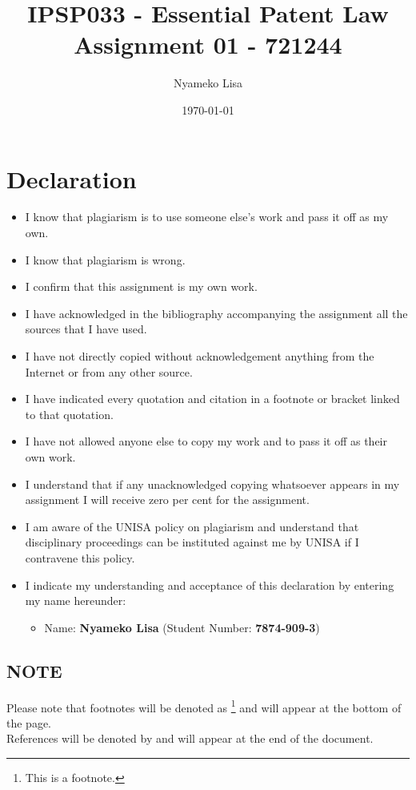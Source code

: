 \documentclass[11pt]{article}
\author{Nyameko Lisa}
\date{\today}
\title{IPSP033 - Essential Patent Law\\\medskip
\large Assignment 01 - 721244}
\begin{document}
\maketitle

\justifying
\section*{Declaration}
\label{sec:org9d7821d}
\begin{itemize}
\item I know that plagiarism is to use someone else’s work and pass it off as my own.
\item I know that plagiarism is wrong.
\item I confirm that this assignment is my own work.
\item I have acknowledged in the bibliography accompanying the assignment all the sources that I have used.
\item I have not directly copied without acknowledgement anything from the Internet or from any other source.
\item I have indicated every quotation and citation in a footnote or bracket linked to that quotation.
\item I have not allowed anyone else to copy my work and to pass it off as their own work.
\item I understand that if any unacknowledged copying whatsoever appears in my assignment I will receive zero per cent for the assignment.
\item I am aware of the UNISA policy on plagiarism and understand that disciplinary proceedings can be instituted against me by UNISA if I contravene this policy.
\item I indicate my understanding and acceptance of this declaration by
entering my name hereunder:
\begin{itemize}
\item Name: \textbf{Nyameko Lisa} (Student Number: \textbf{7874-909-3})
\end{itemize}
\end{itemize}

\subsection*{NOTE}
\label{sec:orgec3205d}
Please note that footnotes will be denoted as \footnote{This is a footnote.} and will
appear at the bottom of the page.\\
References will be denoted by \cite{rsa78_patents_act} and will appear at the end of the document.
\newpage
\end{document}
